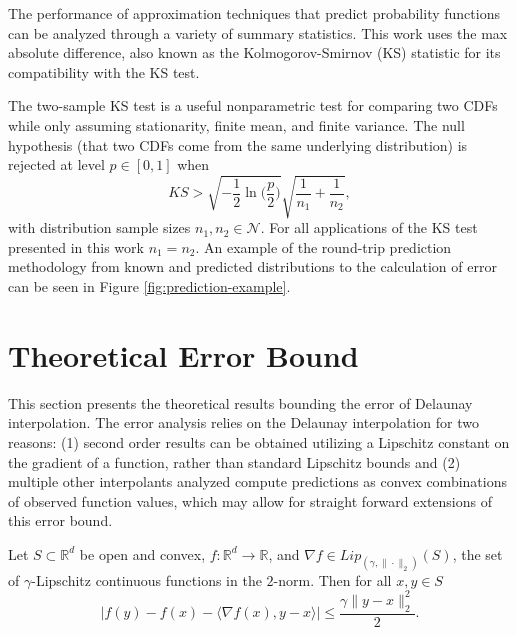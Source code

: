 \documentclass[smallextended,final]{svjour3}       %
\begin{document}
The performance of approximation techniques that predict probability
functions can be analyzed through a variety of summary
statistics. This work uses the max absolute difference, also known as
the Kolmogorov-Smirnov (KS) statistic \cite{lilliefors1967kolmogorov}
for its compatibility with the KS test.

The two-sample KS test is a useful nonparametric test for comparing
two CDFs while only assuming stationarity, finite mean, and finite
variance. The null hypothesis (that two CDFs come from the same
underlying distribution) is rejected at level $p \in [0,1]$ when
$$ KS > \sqrt{-\frac{1}{2}\ln\biggl(\frac{p}{2}\biggr)} \sqrt{\frac{1}{n_1} + \frac{1}{n_2}}, $$
with distribution sample sizes $n_1,n_2 \in \mathcal{N}$. For all
applications of the KS test presented in this work $n_1 = n_2$. An
example of the round-trip prediction methodology from known and
predicted distributions to the calculation of error can be seen in
Figure \ref{fig:prediction-example}.

\section{Theoretical Error Bound}
\label{sec:theory}

This section presents the theoretical results bounding the error of
Delaunay interpolation. The error analysis relies on the Delaunay
interpolation for two reasons: (1) second order results can be
obtained utilizing a Lipschitz constant on the gradient of a function,
rather than standard Lipschitz bounds and (2) multiple other
interpolants analyzed compute predictions as convex combinations of
observed function values, which may allow for straight forward
extensions of this error bound.

\begin{plainlemma}
  \label{lemma:1}
  Let $S \subset \mathbb{R}^d$ be open and convex, $f: \mathbb{R}^d
  \rightarrow \mathbb{R}$, and $\nabla f \in
  Lip_{(\gamma,\|\cdot\|_2)}(S)$, the set of $\gamma$-Lipschitz
  continuous functions in the $2$-norm. Then for all $x,y \in S$
  $$\big|f(y) - f(x) - \langle \nabla f(x), y - x \rangle \big| \leq \frac{\gamma \|y - x\|_2^2}{2}.$$
\end{plainlemma}
\end{document}

